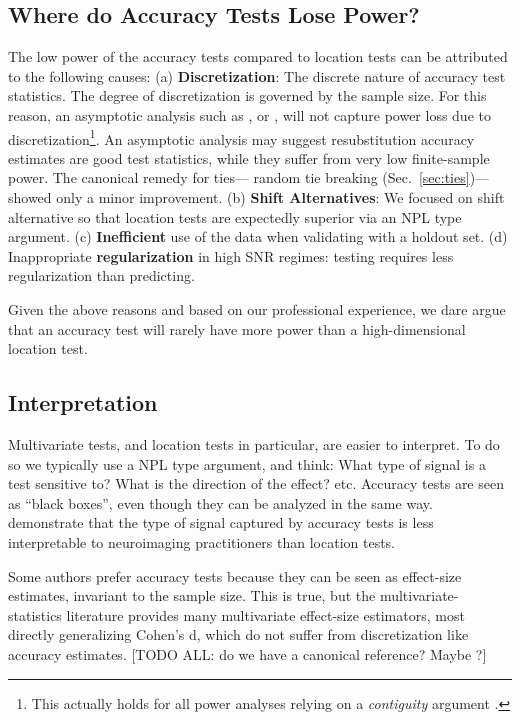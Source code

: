 \documentclass[12pt,a4paper]{article}
\begin{document}
\subsection{Where do Accuracy Tests Lose Power?}
The low power of the accuracy tests compared to location tests can be attributed to the following causes: \newline
(a) \textbf{Discretization}: 
The discrete nature of accuracy test statistics. 
The degree of discretization is governed by the sample size. 
For this reason, an asymptotic analysis such as \cite{ramdas_classification_2016}, or \cite{golland_permutation_2005}, will not capture power loss due to discretization\footnote{This actually holds for all power analyses relying on a \emph{contiguity} argument \cite[Ch.6]{vaart_asymptotic_1998}.}.
An asymptotic analysis may suggest resubstitution accuracy estimates are good test statistics, while they suffer from very low finite-sample power. 
The canonical remedy for ties--- random tie breaking (Sec.~\ref{sec:ties})--- showed only a minor improvement. \newline
(b) \textbf{Shift Alternatives}: 
We focused on shift alternative so that location tests are expectedly superior via an NPL type argument.\newline
(c) \textbf{Inefficient} use of the data when validating with a holdout set. \newline
(d) Inappropriate \textbf{regularization} in high SNR regimes: testing requires less regularization than predicting. \newline

Given the above reasons and based on our professional experience, we dare argue that an accuracy test will rarely have more power than a high-dimensional location test. 




\subsection{Interpretation}
Multivariate tests, and location tests in particular, are easier to interpret. 
To do so we typically use a NPL type argument, and think:
What type of signal is a test sensitive to?
What is the direction of the effect? etc.
Accuracy tests are seen as ``black boxes'', even though they can be analyzed in the same way. 
\citet{gilron2017s} demonstrate that the type of signal captured by accuracy tests is less interpretable to neuroimaging practitioners than location tests. 

Some authors prefer accuracy tests because they can be seen as effect-size estimates, invariant to the sample size. 
This is true, but the multivariate-statistics literature provides many multivariate effect-size estimators, most directly generalizing Cohen's d, which do not suffer from discretization like accuracy estimates. [TODO ALL: do we have a canonical reference? Maybe \cite{olejnik2000measures}?]
\end{document}
